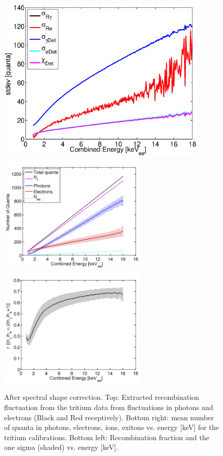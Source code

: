  \begin{figure}[h!]\centering
 \includegraphics[width=100mm]{Recombination_LY_QY/Figures/Iter1/std_fig_.eps}
 \includegraphics[width=70mm]{Recombination_LY_QY/Figures/Iter1/quanta_iter1LY_QY_iter1.png}
 \includegraphics[width=70mm]{Recombination_LY_QY/Figures/Iter1/R_iter1_LY_QY_iter1.png}
\caption{After spectral shape correction. Top: Extracted recombination fluctuation from the tritium data from fluctuations in photons and electrons (Black and Red receptively). Bottom right: mean number of quanta in photons, electrons, ions, exitons vs. energy [keV] for the tritium calibrations. Bottom left: Recombination fraction and the one sigma (shaded) vs. energy [keV].}
\label{fig:Rec_1}
\end{figure}


